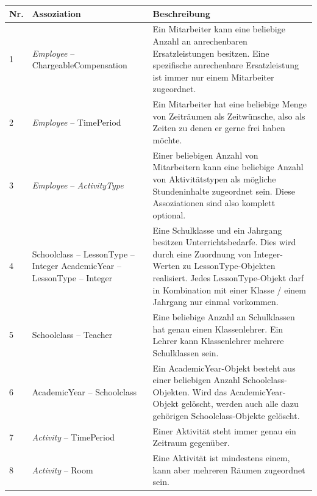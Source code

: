\documentclass[fontsize=12pt,paper=a4,twoside]{scrartcl}
\begin{document}
\begin{tabularx}{\textwidth}{|p{0.6cm}|p{5cm}|X|}
\hline
\textbf{Nr.} & \textbf{Assoziation} & \textbf{Beschreibung} \\\hline
1 	& \textit{Employee} -- ChargeableCompensation	& Ein Mitarbeiter kann eine beliebige Anzahl
	an anrechenbaren Ersatzleistungen besitzen. Eine spezifische anrechenbare Ersatzleistung ist immer nur einem Mitarbeiter zugeordnet. \\\hline
2	& \textit{Employee} -- TimePeriod		& Ein Mitarbeiter hat eine beliebige Menge von 
	Zeiträumen als Zeitwünsche, also als Zeiten zu denen er gerne frei haben möchte. \\\hline
3	& \textit{Employee} -- \textit{ActivityType} & Einer beliebigen Anzahl von Mitarbeitern kann
	eine beliebige Anzahl von Aktivitätstypen als mögliche Stundeninhalte zugeordnet sein. Diese Assoziationen sind also komplett optional. \\\hline
4	& Schoolclass -- LessonType -- Integer \newline
	  AcademicYear -- LessonType -- Integer				& Eine Schulklasse und ein Jahrgang besitzen Unterrichtsbedarfe. Dies wird durch eine Zuordnung von Integer-Werten zu LessonType-Objekten realisiert. Jedes LessonType-Objekt darf in Kombination mit einer Klasse / einem Jahrgang nur einmal vorkommen. \\\hline
5	& Schoolclass -- Teacher 				& Eine beliebige Anzahl an Schulklassen hat genau
	einen Klassenlehrer. Ein Lehrer kann Klassenlehrer mehrere Schulklassen sein. \\\hline
6	& AcademicYear -- Schoolclass 			& Ein AcademicYear-Objekt besteht aus einer beliebigen 
	Anzahl Schoolclass-Objekten. Wird das AcademicYear-Objekt gelöscht, werden auch alle dazu gehörigen Schoolclass-Objekte gelöscht.\\\hline
7	& \textit{Activity} -- TimePeriod				& Einer Aktivität steht immer genau ein
	Zeitraum gegenüber.\\\hline
8	& \textit{Activity} -- Room						& Eine Aktivität ist mindestens einem, kann 
	aber mehreren Räumen zugeordnet sein.\\\hline
\end{tabularx}
\end{document}
